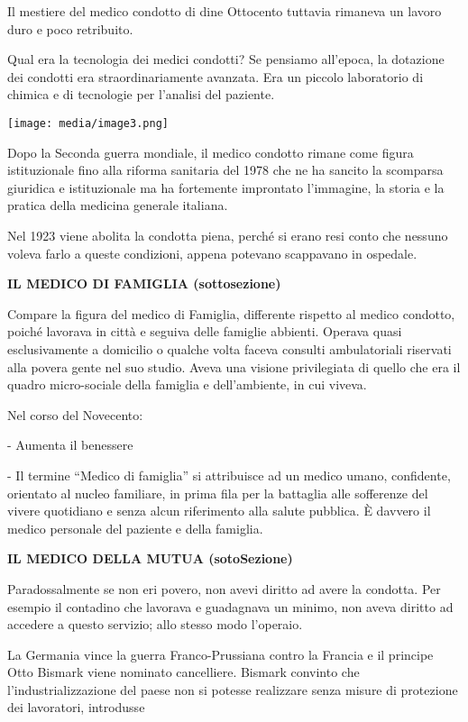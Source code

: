 \documentclass[]{article}
\begin{document}
Il mestiere del medico condotto di dine Ottocento tuttavia rimaneva un
lavoro duro e poco retribuito.

Qual era la tecnologia dei medici condotti? Se pensiamo all'epoca, la
dotazione dei condotti era straordinariamente avanzata. Era un piccolo
laboratorio di chimica e di tecnologie per l'analisi del paziente.

\texttt{[image: media/image3.png]}

Dopo la Seconda guerra mondiale, il medico condotto rimane come figura
istituzionale fino alla riforma sanitaria del 1978 che ne ha sancito la
scomparsa giuridica e istituzionale ma ha fortemente improntato
l'immagine, la storia e la pratica della medicina generale italiana.

Nel 1923 viene abolita la condotta piena, perché si erano resi conto che
nessuno voleva farlo a queste condizioni, appena potevano scappavano in
ospedale.

\textbf{IL MEDICO DI FAMIGLIA (sottosezione) }

Compare la figura del medico di Famiglia, differente rispetto al medico
condotto, poiché lavorava in città e seguiva delle famiglie abbienti.
Operava quasi esclusivamente a domicilio o qualche volta faceva consulti
ambulatoriali riservati alla povera gente nel suo studio. Aveva una
visione privilegiata di quello che era il quadro micro-sociale della
famiglia e dell'ambiente, in cui viveva.

Nel corso del Novecento:

- Aumenta il benessere

- Il termine ``Medico di famiglia'' si attribuisce ad un medico umano,
confidente, orientato al nucleo familiare, in prima fila per la
battaglia alle sofferenze del vivere quotidiano e senza alcun
riferimento alla salute pubblica. È davvero il medico personale del
paziente e della famiglia.

\textbf{IL MEDICO DELLA MUTUA (sotoSezione)}

Paradossalmente se non eri povero, non avevi diritto ad avere la
condotta. Per esempio il contadino che lavorava e guadagnava un minimo,
non aveva diritto ad accedere a questo servizio; allo stesso modo
l'operaio.

La Germania vince la guerra Franco-Prussiana contro la Francia e il
principe Otto Bismark viene nominato cancelliere. Bismark convinto che
l'industrializzazione del paese non si potesse realizzare senza misure
di protezione dei lavoratori, introdusse
\end{document}
